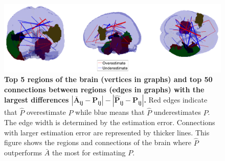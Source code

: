\documentclass[10pt,letterpaper]{article}
\renewcommand{\hat}{\widehat}
\begin{document}
\begin{figure}[!htb]
\centering
\includegraphics[width=1\textwidth]{Diff_between_desikan.png}
\caption{{\bf Top 5 regions of the brain (vertices in graphs) and top 50 connections between regions (edges in graphs) with the largest differences $\bm{|\bar{A}_{ij} - P_{ij}| - |\hat{P}_{ij} - P_{ij}|}$.}
Red edges indicate that $\hat{P}$ overestimate $P$ while blue means that $\hat{P}$ underestimates $P$. The edge width is determined by the estimation error. Connections with larger estimation error are represented by thicker lines. This figure shows the regions and connections of the brain where $\hat{P}$ outperforms $\bar{A}$ the most for estimating $P$.}
\label{fig:Diff_between_desikan}
\end{figure}
\end{document}

